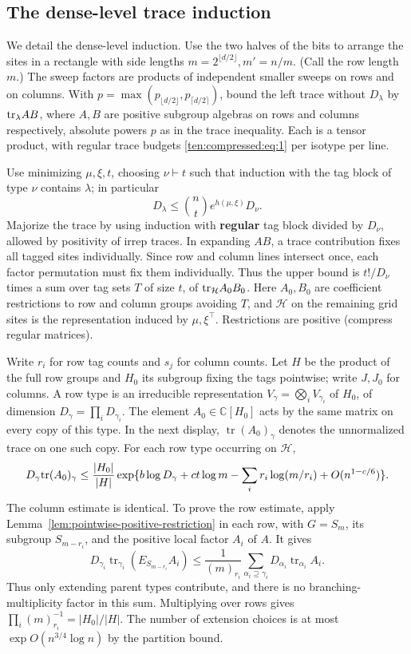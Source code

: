 \subsection{The dense-level trace induction}
We detail the dense-level induction. Use the two halves of the bits to arrange the sites in a rectangle with side lengths \(m=2^{\lfloor d/2\rfloor},m'=n/m\). (Call the row length \(m\).) The sweep factors are products of independent smaller sweeps on rows and on columns. With \(p=\max(p_{\lfloor d/2\rfloor},p_{\lceil d/2\rceil})\), bound the left trace without \(D_\lambda\) by \({\rm tr}_\lambda AB\), where \(A,B\) are positive subgroup algebras on rows and columns respectively, absolute powers \(p\) as in the trace inequality. Each is a tensor product, with regular trace budgets \eqref{ten:compressed:eq:1} per isotype per line.

Use minimizing \(\mu,\xi,t\), choosing \(\nu\vdash t\) such that induction with the tag block of type \(\nu\) contains \(\lambda\); in particular
\[
 D_\lambda\le \binom{n}{t}e^{h(\mu,\xi)}D_\nu .
\]
Majorize the trace by using induction with \textbf{regular} tag block divided by \(D_\nu\), allowed by positivity of irrep traces. In expanding \(AB\), a trace contribution fixes all tagged sites individually. Since row and column lines intersect once, each factor permutation must fix them individually. Thus the upper bound is \(t!/D_\nu\) times a sum over tag sets \(T\) of size \(t\), of \({\rm tr}_{\mathcal H} A_0 B_0\). Here \(A_0,B_0\) are coefficient restrictions to row and column groups avoiding \(T\), and \(\mathcal H\) on the remaining grid sites is the representation induced by \(\mu,\xi^\top\). Restrictions are positive (compress regular matrices).

Write $r_i$ for row tag counts and $s_j$ for column counts. Let
$H$ be the product of the full row groups and $H_0$ its subgroup
fixing the tags pointwise; write $J,J_0$ for columns. A row type is
an irreducible representation $V_\gamma=\bigotimes_iV_{\gamma_i}$
of $H_0$, of dimension $D_\gamma=\prod_iD_{\gamma_i}$.
The element $A_0\in\mathbb C[H_0]$ acts by the same matrix on every
copy of this type. In the next display,
$\operatorname{tr}(A_0)_\gamma$ denotes the unnormalized trace on
one such copy. For each row type occurring on $\mathcal H$,
\begin{equation}
 D_\gamma {\rm tr}(A_0)_\gamma
 \le \frac{|H_0|}{|H|}
 \exp\{b\log D_\gamma+c t\log m-\sum_i r_i\log(m/r_i)
            +O(n^{1-c/6})\}.
 \label{ten:compressed:eq:3}
\end{equation}
The column estimate is identical. To prove the row estimate, apply
Lemma~\ref{lem:pointwise-positive-restriction} in each row, with
$G=S_m$, its subgroup $S_{m-r_i}$, and the positive local factor
$A_i$ of $A$. It gives
\[
 D_{\gamma_i}\operatorname{tr}_{\gamma_i}
       (E_{S_{m-r_i}}A_i)
 \le\frac1{(m)_{r_i}}
       \sum_{\alpha_i\supseteq\gamma_i}
       D_{\alpha_i}\operatorname{tr}_{\alpha_i}A_i.
\]
Thus only extending parent types contribute, and there is no
branching-multiplicity factor in this sum. Multiplying over rows
gives $\prod_i(m)_{r_i}^{-1}=|H_0|/|H|$.
The number of extension choices is at most
$\exp O(n^{3/4}\log n)$ by the partition bound.

